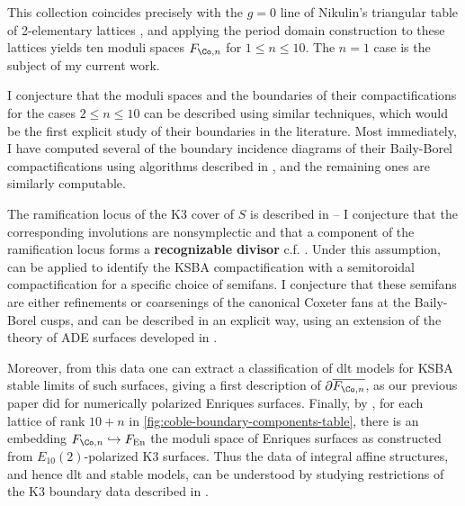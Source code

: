 \documentclass{amsart}
\begin{document}
\begin{remark}

This collection coincides precisely with the \(g=0\) line of Nikulin's triangular table of 2-elementary lattices \cite[Fig.\,1]{AE22}, and applying the period domain construction to these lattices yields ten moduli spaces \(F_{\Co, n}\) for \(1\leq n \leq 10\). The \(n=1\) case is the subject of my current work.

I conjecture that the moduli spaces and the boundaries of their compactifications for the cases \(2\leq n \leq 10\) can be described using similar techniques, which would be the first explicit study of their boundaries in the literature. Most immediately, I have computed several of the boundary incidence diagrams of their Baily-Borel compactifications using algorithms described in \cite{AE22nonsympinv}, and the remaining ones are similarly computable.

\end{remark}

\begin{remark}

The ramification locus of the K3 cover of \(S\) is described in \cite[Eqn. 5.3.1]{EnriquesOne} -- I conjecture that the corresponding involutions are nonsymplectic and that a component of the ramification locus forms a \textbf{recognizable divisor} c.f. \cite{alexeevCompactModuliK32023,AEH21}. Under this assumption, \cite[Thm.\,3.24]{AEH21} can be applied to identify the KSBA compactification with a semitoroidal compactification for a specific choice of semifans. I conjecture that these semifans are either refinements or coarsenings of the canonical Coxeter fans at the Baily-Borel cusps, and can be described in an explicit way, using an extension of the theory of ADE surfaces developed in \cite{AT21}.

Moreover, from this data one can extract a classification of dlt models for KSBA stable limits of such surfaces, giving a first description of \(\partial \overline{F_{\Co, n}}\), as our previous paper \cite{AEGS23} did for numerically polarized Enriques surfaces. Finally, by \cite[Prop.\,5.4.6]{EnriquesOne}, for each lattice of rank \(10+n\) in \cref{fig:coble-boundary-components-table}, there is an embedding \(F_{\Co, n}\hookrightarrow F_{\operatorname{En}}\) the moduli space of Enriques surfaces as constructed from \(E_{10}(2)\)-polarized K3 surfaces. Thus the data of integral affine structures, and hence dlt and stable models, can be understood by studying restrictions of the K3 boundary data described in \cite{AE22}.

\end{remark}
\end{document}
